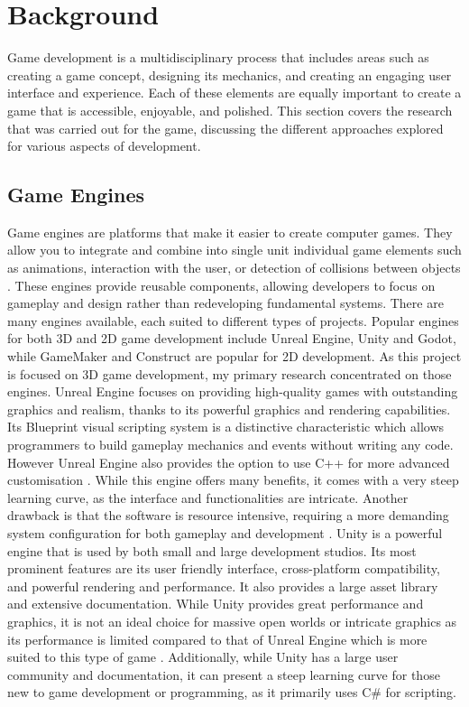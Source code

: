 \documentclass[]{final_report}
\begin{document}
\chapter{Background}
Game development is a multidisciplinary process that includes areas such as creating a game concept, designing its mechanics, and creating an engaging user interface and experience. Each of these elements are equally important to create a game that is accessible, enjoyable, and polished. \color{red}This section covers the research that was carried out for the game, discussing the different approaches explored for various aspects of development. \color{black}


\section{Game Engines}
Game engines are platforms that make it easier to create computer games. They allow you to integrate and combine into single unit individual game elements such as animations, interaction with the user, or detection of collisions between objects \cite{Barczak2019}. These engines provide reusable components, allowing developers to focus on gameplay and design rather than redeveloping fundamental systems. There are many engines available, each suited to different types of projects. Popular engines for both 3D and 2D game development include Unreal Engine, Unity and Godot, while GameMaker and Construct are popular for 2D development. \color{red}As this project is focused on 3D game development, my primary research concentrated on those engines.\color{black}
\newline
Unreal Engine focuses on providing high-quality games with outstanding graphics and realism, thanks to its powerful graphics and rendering capabilities. Its Blueprint visual scripting system is a distinctive characteristic which allows programmers to build gameplay mechanics and events without writing any code. However Unreal Engine also provides the option to use C++ for more advanced customisation \cite{eventyr_2023}. While this engine offers many benefits, it comes with a very steep learning curve, as the interface and functionalities are intricate. Another drawback is that the software is resource intensive, requiring a more demanding system configuration for both gameplay and development \cite{eventyr_2023}. 
\newline
Unity is a powerful engine that is used by both small and large development studios. Its most prominent features are its user friendly interface, cross-platform compatibility, and powerful rendering and performance. It also provides a large asset library and extensive documentation. While Unity provides great performance and graphics, it is not an ideal choice for massive open worlds or intricate graphics as its performance is limited compared to that of Unreal Engine which is more suited to this type of game \cite{medium_2024}. Additionally, while Unity has a large user community and documentation, it can present a steep learning curve for those new to game development or programming, as it primarily uses C\# for scripting.
\end{document}
